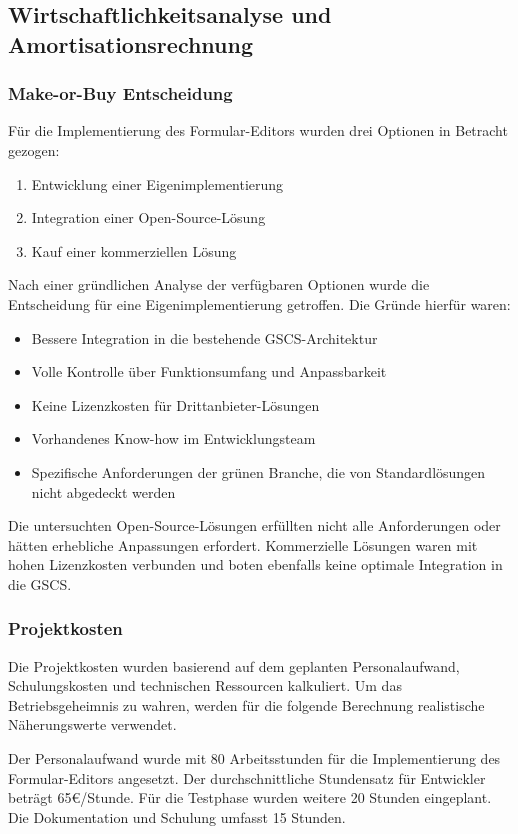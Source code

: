 \documentclass[a4paper,11pt]{article}
\begin{document}
\subsection{Wirtschaftlichkeitsanalyse und Amortisationsrechnung}
\subsubsection{Make-or-Buy Entscheidung}
Für die Implementierung des Formular-Editors wurden drei Optionen in Betracht gezogen:

\begin{enumerate}
  \item Entwicklung einer Eigenimplementierung
  \item Integration einer Open-Source-Lösung
  \item Kauf einer kommerziellen Lösung
\end{enumerate}

Nach einer gründlichen Analyse der verfügbaren Optionen wurde die Entscheidung für eine Eigenimplementierung getroffen. Die Gründe hierfür waren:

\begin{itemize}
  \item Bessere Integration in die bestehende GSCS-Architektur
  \item Volle Kontrolle über Funktionsumfang und Anpassbarkeit
  \item Keine Lizenzkosten für Drittanbieter-Lösungen
  \item Vorhandenes Know-how im Entwicklungsteam
  \item Spezifische Anforderungen der grünen Branche, die von Standardlösungen nicht abgedeckt werden
\end{itemize}

Die untersuchten Open-Source-Lösungen erfüllten nicht alle Anforderungen oder hätten erhebliche Anpassungen erfordert. Kommerzielle Lösungen waren mit hohen Lizenzkosten verbunden und boten ebenfalls keine optimale Integration in die GSCS.

\subsubsection{Projektkosten}
Die Projektkosten wurden basierend auf dem geplanten Personalaufwand, Schulungskosten und technischen Ressourcen kalkuliert. Um das Betriebsgeheimnis zu wahren, werden für die folgende Berechnung realistische Näherungswerte verwendet.

Der Personalaufwand wurde mit 80 Arbeitsstunden für die Implementierung des Formular-Editors angesetzt. Der durchschnittliche Stundensatz für Entwickler beträgt 65€/Stunde. Für die Testphase wurden weitere 20 Stunden eingeplant. Die Dokumentation und Schulung umfasst 15 Stunden.
\end{document}
